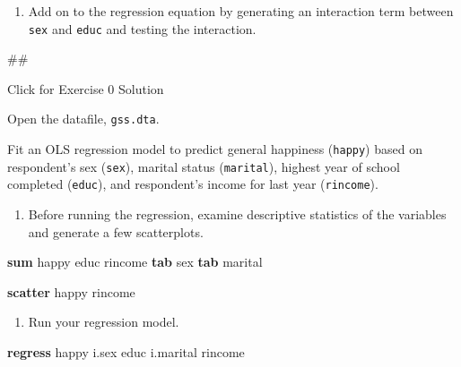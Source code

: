 \documentclass[
]{book}
\newenvironment{Shaded}{\begin{snugshade}}{\end{snugshade}}
\newcommand{\KeywordTok}[1]{\textcolor[rgb]{0.13,0.29,0.53}{\textbf{#1}}}
\newcommand{\NormalTok}[1]{#1}
\providecommand{\tightlist}{%
  \setlength{\itemsep}{0pt}\setlength{\parskip}{0pt}}
\begin{document}
\begin{enumerate}
\def\labelenumi{\arabic{enumi}.}
\setcounter{enumi}{3}
\tightlist
\item
  Add on to the regression equation by generating an interaction term between \texttt{sex} and \texttt{educ} and testing the interaction.
\end{enumerate}

\begin{Shaded}
\begin{Highlighting}[]
\NormalTok{\#\#}
\end{Highlighting}
\end{Shaded}

{Click for Exercise 0 Solution}

Open the datafile, \texttt{gss.dta}.

Fit an OLS regression model to predict general happiness (\texttt{happy}) based on respondent's sex (\texttt{sex}), marital status (\texttt{marital}), highest year of school completed (\texttt{educ}), and respondent's income for last year (\texttt{rincome}).

\begin{enumerate}
\def\labelenumi{\arabic{enumi}.}
\tightlist
\item
  Before running the regression, examine descriptive statistics of the variables and generate a few scatterplots.
\end{enumerate}

\begin{Shaded}
\begin{Highlighting}[]
\KeywordTok{sum}\NormalTok{ happy educ rincome }
\KeywordTok{tab}\NormalTok{ sex }
\KeywordTok{tab}\NormalTok{ marital }

\KeywordTok{scatter}\NormalTok{ happy rincome}
\end{Highlighting}
\end{Shaded}

\begin{enumerate}
\def\labelenumi{\arabic{enumi}.}
\setcounter{enumi}{1}
\tightlist
\item
  Run your regression model.
\end{enumerate}

\begin{Shaded}
\begin{Highlighting}[]
\KeywordTok{regress}\NormalTok{ happy i.sex educ i.marital rincome}
\end{Highlighting}
\end{Shaded}
\end{document}
